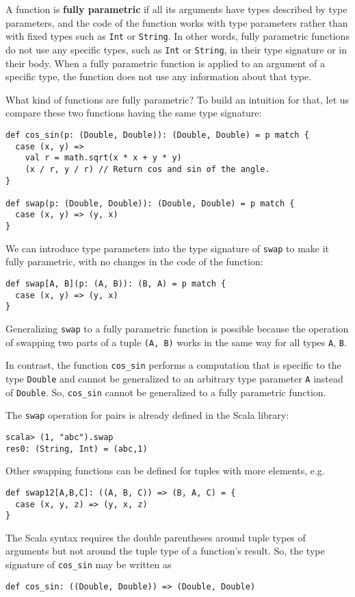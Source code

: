 A function is \textbf{fully parametric}
if all its arguments have types described by type parameters, and
the code of the function works with type parameters rather than with
fixed types such as \lstinline!Int! or \lstinline!String!. In other
words, fully parametric functions do not use any specific types, such
as \lstinline!Int! or \lstinline!String!, in their type signature
or in their body. When a fully parametric function is applied to an
argument of a specific type, the function does not use any information
about that type. 

What kind of functions are fully parametric? To build an intuition
for that, let us compare these two functions having the same type
signature:
\begin{lstlisting}
def cos_sin(p: (Double, Double)): (Double, Double) = p match {
  case (x, y) =>
    val r = math.sqrt(x * x + y * y)
    (x / r, y / r) // Return cos and sin of the angle.
}

def swap(p: (Double, Double)): (Double, Double) = p match {
  case (x, y) => (y, x)
}
\end{lstlisting}
We can introduce type parameters into the type signature of \lstinline!swap!
to make it fully parametric, with no changes in the code of the function:
\begin{lstlisting}
def swap[A, B](p: (A, B)): (B, A) = p match {
  case (x, y) => (y, x)
}
\end{lstlisting}
Generalizing \lstinline!swap! to a fully parametric function is possible
because the operation of swapping two parts of a tuple \lstinline!(A, B)!
works in the same way for all types \lstinline!A!, \lstinline!B!.

In contrast, the function \lstinline!cos_sin! performs a computation
that is specific to the type \lstinline!Double! and cannot be generalized
to an arbitrary type parameter \lstinline!A! instead of \lstinline!Double!.
So, \lstinline!cos_sin! cannot be generalized to a fully parametric
function.

The \lstinline!swap! operation for pairs is already defined in the
Scala library:
\begin{lstlisting}
scala> (1, "abc").swap
res0: (String, Int) = (abc,1)
\end{lstlisting}
Other swapping functions can be defined for tuples with more elements,
e.g.
\begin{lstlisting}
def swap12[A,B,C]: ((A, B, C)) => (B, A, C) = {
  case (x, y, z) => (y, x, z)
}
\end{lstlisting}
The Scala syntax requires the double parentheses around tuple types
of arguments but not around the tuple type of a function's result.
So, the type signature of \lstinline!cos_sin! may be written as
\begin{lstlisting}
def cos_sin: ((Double, Double)) => (Double, Double)
\end{lstlisting}


